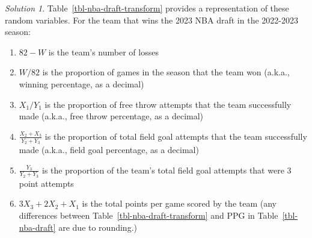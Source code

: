 \documentclass[
  letterpaper,
  DIV=11,
  numbers=noendperiod]{scrreprt}
\providecommand{\tightlist}{%
  \setlength{\itemsep}{0pt}\setlength{\parskip}{0pt}}
\theoremstyle{plain}
\theoremstyle{definition}
\theoremstyle{definition}
\theoremstyle{definition}
\theoremstyle{remark}
\newtheorem{refsolution}{Solution}[chapter]
\begin{document}
\begin{tcolorbox}[enhanced jigsaw, opacityback=0, rightrule=.15mm, coltitle=black, colframe=quarto-callout-tip-color-frame, toprule=.15mm, colbacktitle=quarto-callout-tip-color!10!white, opacitybacktitle=0.6, left=2mm, toptitle=1mm, breakable, title={Solution (click to expand)}, bottomtitle=1mm, colback=white, leftrule=.75mm, titlerule=0mm, arc=.35mm, bottomrule=.15mm]

\begin{refsolution}
Table~\ref{tbl-nba-draft-transform} provides a representation of these
random variables. For the team that wins the 2023 NBA draft in the
2022-2023 season:

\begin{enumerate}
\def\labelenumi{\arabic{enumi}.}
\tightlist
\item
  \(82 - W\) is the team's number of losses
\item
  \(W / 82\) is the proportion of games in the season that the team won
  (a.k.a., winning percentage, as a decimal)
\item
  \(X_1 / Y_1\) is the proportion of free throw attempts that the team
  successfully made (a.k.a., free throw percentage, as a decimal)
\item
  \(\frac{X_2 + X_3}{Y_2+Y_3}\) is the proportion of total field goal
  attempts that the team successfully made (a.k.a., field goal
  percentage, as a decimal)
\item
  \(\frac{Y_3}{Y_2+Y_3}\) is the proportion of the team's total field
  goal attempts that were 3 point attempts
\item
  \(3X_3 + 2X_2 + X_1\) is the total points per game scored by the team
  (any differences between Table~\ref{tbl-nba-draft-transform} and PPG
  in Table~\ref{tbl-nba-draft} are due to rounding.)
\end{enumerate}

\label{sol-rv-transform-simple}

\end{refsolution}

\end{tcolorbox}
\end{document}
